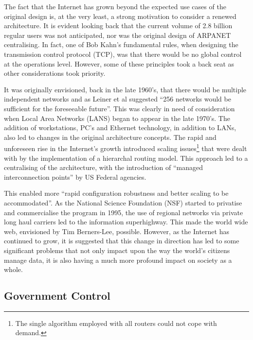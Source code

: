 \documentclass[twocolumn,english]{article}
\begin{document}
The fact that the Internet has grown beyond the expected use cases of the original design is, at the very least, a strong motivation to consider a renewed architecture. It is evident looking back that the current volume of
2.8 billion regular users\cite{mwg13} was not anticipated, nor was the original design of ARPANET centralising. In fact, one of Bob Kahn\textquoteright s fundamental rules, when designing the transmission control protocol (TCP), was that there would be no global control at the operations level\cite{isocBriefHistory}. However, some of these principles took a back seat as other considerations took priority.

It was originally envisioned, back in the late 1960\textquoteright s,
that there would be multiple independent networks and as Leiner et
al suggested \textquotedblleft 256 networks would be sufficient
for the foreseeable future''. This was clearly in need of consideration
when Local Area Networks (LANS) began to appear in the late 1970\textquoteright s. The addition of workstations, PC\textquoteright s and Ethernet technology, in addition to LANs, also led to changes in the original architecture
concepts. The rapid and unforeseen rise in the Internet\textquoteright s
growth introduced scaling issues\footnote{The single algorithm employed with
all routers could not cope with demand.} that were dealt with by the
implementation of a hierarchal routing model. This approach led to
a centralising of the architecture, with the introduction
of \textquotedblleft managed interconnection points\textquotedblright{}
by US Federal agencies. 

This enabled more \textquotedblleft rapid configuration robustness
and better scaling to be accommodated\textquotedblright. As the National Science Foundation (NSF) started to privatise and
commercialise the program in 1995, the use of regional networks via
private long haul carriers led to the information superhighway.  This made the world wide web, envisioned
by Tim Berners-Lee, possible. However, as the
Internet has continued to grow, it is suggested that this change in
direction has led to some significant problems that not only impact
upon the way the world\textquoteright s citizens manage data, it is also
having a much more profound impact on society as a whole. 


\subsection{Government Control}
\end{document}
